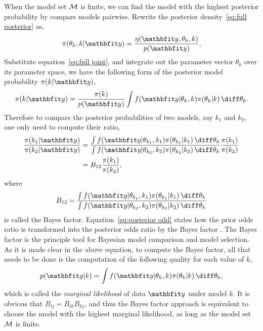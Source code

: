 When the model set $\mathcal{M}$ is finite, we can find the model with the highest
posterior probability by compare models pairwise. Rewrite the posterior
density~\eqref{eq:full posterior} as,
\begin{equation}
  \pi(\theta_k,k|\data) = \frac{\eta(\data,\theta_k,k)}{p(\data)}.
\end{equation}
Substitute equation~\eqref{eq:full joint}, and integrate out the parameter
vector $\theta_k$ over its parameter space, we have the following form of the
posterior model probability $\pi(k|\data)$,
\begin{equation}
  \pi(k|\data) = \frac{\pi(k)}{p(\data)}
  \int f(\data|\theta_k,k)\pi(\theta_k|k)\intd\theta_k.
\end{equation}
Therefore to compare the posterior probabilities of two models, say $k_1$ and
$k_2$, one only need to compute their ratio,
\begin{align}
  \frac{\pi(k_1|\data)}{\pi(k_2|\data)} &= \frac
  {\int f(\data|\theta_{k_1},k_1)\pi(\theta_{k_1}|k_1)\intd\theta_k}
  {\int f(\data|\theta_{k_2},k_2)\pi(\theta_{k_2}|k_2)\intd\theta_k}
  \frac{\pi(k_1)}{\pi(k_2)} \notag\\
  & = B_{12} \frac{\pi(k_1)}{\pi(k_2)},
  \label{eq:posterior odd}
\end{align}
where
\begin{equation}
  B_{12} = \frac
  {\int f(\data|\theta_{k_1},k_1)\pi(\theta_{k_1}|k_1)\intd\theta_k}
  {\int f(\data|\theta_{k_2},k_2)\pi(\theta_{k_2}|k_2)\intd\theta_k}
  \label{eq:bayes factor}
\end{equation}
is called the Bayes factor. Equation~\eqref{eq:posterior odd} states how the
prior odds ratio is transformed into the posterior odds ratio by the Bayes
factor \cite{Kass:1995vb}. The Bayes factor is the principle tool for
Bayesian model comparison and model selection. As it is made clear in the
above equation, to compute the Bayes factor, all that needs to be done is the
computation of the following quality for each value of $k$,
\begin{equation}
  p(\data|k) = 
  \int f(\data|\theta_k,k)\pi(\theta_k|k)\intd\theta_k,
  \label{eq:marginal likelihood}
\end{equation}
which is called the \emph{marginal likelihood} of data $\data$ under model
$k$.  It is obvious that $B_{ij} = B_{ik} B_{kj}$, and thus the Bayes
factor approach is equivalent to choose the model with the highest marginal
likelihood, as long as the model set $\mathcal{M}$ is finite.

